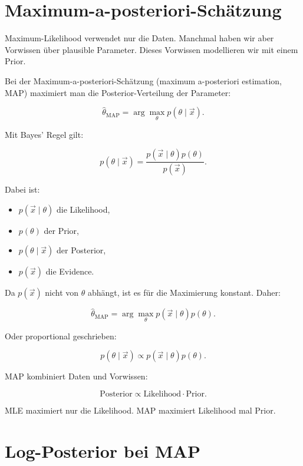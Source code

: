 \section{Maximum-a-posteriori-Schätzung}

Maximum-Likelihood verwendet nur die Daten.
Manchmal haben wir aber Vorwissen über plausible Parameter.
Dieses Vorwissen modellieren wir mit einem Prior.

\begin{definitionbox}
Bei der Maximum-a-posteriori-Schätzung (maximum a-posteriori estimation, MAP) maximiert man die Posterior-Verteilung der Parameter:

\[
    \hat{\theta}_{\mathrm{MAP}}
    =
    \arg\max_{\theta}
    p(\theta \mid \vec{x}).
\]
\end{definitionbox}

Mit Bayes' Regel gilt:

\[
    p(\theta \mid \vec{x})
    =
    \frac{
        p(\vec{x} \mid \theta)p(\theta)
    }{
        p(\vec{x})
    }.
\]

Dabei ist:

\begin{itemize}
    \item \(p(\vec{x} \mid \theta)\) die Likelihood,
    \item \(p(\theta)\) der Prior,
    \item \(p(\theta \mid \vec{x})\) der Posterior,
    \item \(p(\vec{x})\) die Evidence.
\end{itemize}

Da \(p(\vec{x})\) nicht von \(\theta\) abhängt, ist es für die Maximierung konstant.
Daher:

\[
    \hat{\theta}_{\mathrm{MAP}}
    =
    \arg\max_{\theta}
    p(\vec{x} \mid \theta)p(\theta).
\]

Oder proportional geschrieben:

\[
    p(\theta \mid \vec{x})
    \propto
    p(\vec{x} \mid \theta)p(\theta).
\]

\begin{conceptbox}
MAP kombiniert Daten und Vorwissen:

\[
    \text{Posterior}
    \propto
    \text{Likelihood}
    \cdot
    \text{Prior}.
\]

MLE maximiert nur die Likelihood.
MAP maximiert Likelihood mal Prior.
\end{conceptbox}

\section{Log-Posterior bei MAP}

